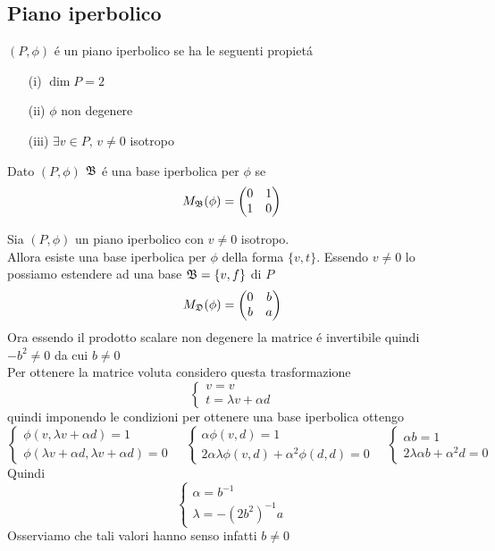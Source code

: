 \subsection{Piano iperbolico}
\begin{defn} $(P,\phi) $ \'e un piano iperbolico se ha le seguenti propiet\'a
\begin{itemize}
\item[(i)]$\dim P=2 $
\item[(ii)]$\phi $ non degenere 
\item[(iii)]$\exists v \in P , \, v\neq 0 $ isotropo
\end{itemize}
\end{defn}
\begin{defn}\bianco
Dato $(P, \phi) $ $\mathfrak{B}$ \'e una base iperbolica per $\phi $ se 
$$ M_{\mathfrak{B}}(\phi) = \begin{pmatrix}
0 & 1 \\ 1 & 0 
\end{pmatrix}$$
\end{defn}
\begin{lem}\label{baseiper}Sia $(P,\phi) $ un piano iperbolico con $ v\neq 0 $ isotropo.\\
Allora esiste una base iperbolica per $\phi$ della forma $\{ v , t \} $.
\proof
Essendo $v\neq 0 $ lo possiamo estendere ad una base $\mathfrak{B} = \{ v, f \} $ di $P$
$$ M_{\mathfrak{D}}(\phi)= \begin{pmatrix}
0 & b \\ b & a 
\end{pmatrix}$$ 
Ora essendo il prodotto scalare non degenere la matrice \'e invertibile quindi $ -b^2 \neq 0 $ da cui $b \neq 0 $\\
Per ottenere la matrice voluta considero questa trasformazione
$$\begin{cases} v = v \\
t= \lambda v +\alpha d 
\end{cases}$$ 
quindi imponendo le condizioni per ottenere una base iperbolica ottengo
$$ \begin{cases}\phi( v, \lambda v +\alpha d ) = 1 \\
\phi(\lambda v +\alpha d , \lambda v +\alpha d )= 0 
\end{cases} \quad \begin{cases} \alpha \phi(v,d)=1 \\
2\alpha\lambda\phi(v,d)+ \alpha^2 \phi(d,d)=0
\end{cases}
 \quad
  \begin{cases} \alpha b =1 \\
2\lambda \alpha b + \alpha^2 d =0
\end{cases} $$
Quindi
$$ \begin{cases} \alpha=b^{-1} \\
\lambda= -( 2b^2)^{-1} a 
\end{cases}$$
Osserviamo che tali valori hanno senso infatti $b \neq 0 $
\endproof
\end{lem}
\newpage
